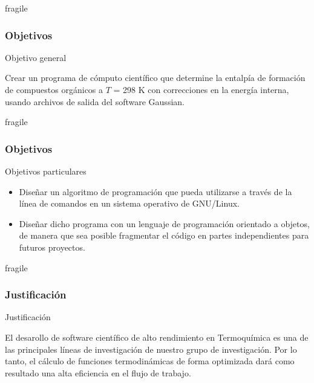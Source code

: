 \documentclass{beamer}
\begin{document}
\begin{frame}{fragile}
\frametitle{Objetivos}

\begin{block}{Objetivo general}

Crear un programa de cómputo científico que determine la entalpía de formación de compuestos orgánicos a $T$ = 298 K con correcciones en la energía interna, usando archivos de salida del software Gaussian.
\end{block}

\end{frame}


\begin{frame}{fragile}
\frametitle{Objetivos}

\begin{block}{Objetivos particulares}

\begin{itemize}

\item Diseñar un algoritmo de programación que pueda utilizarse a través de la línea de comandos en un sistema operativo de GNU/Linux.
\vspace{1cm}
\item Diseñar dicho programa con un lenguaje de programación orientado a objetos, de manera que sea posible fragmentar el código en partes independientes para futuros proyectos.

\end{itemize}
\end{block}
\end{frame}
\begin{frame}{fragile}
\frametitle{Justificación}

\begin{block}{Justificación}

El desarollo de software científico de alto rendimiento en Termoquímica es una de las principales líneas de investigación de nuestro grupo de investigación. Por lo tanto, el cálculo de funciones termodinámicas de forma optimizada dará como resultado una alta eficiencia en el flujo de trabajo.
\end{block}

\end{frame}
\end{document}
